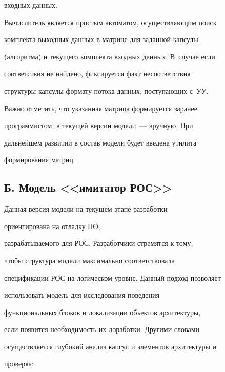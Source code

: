 входных данных.


   


   Вычислитель является простым  автоматом, осуществляющим поиск 


комплекта выходных данных в матрице для заданной капсулы 


(алгоритма) и текущего комплекта  входных данных. В~случае если 


соответствия не найдено,  фиксируется факт несоответствия 


структуры капсулы формату потока  данных, поступающих с~УУ. 


   


   Важно отметить, что указанная матрица формируется заранее 


программистом, в текущей версии модели~--- вручную. При 


дальнейшем развитии в состав модели будет введена утилита 


формирования матриц.





\subsection*{Б. Модель <<имитатор РОС>>}





   Данная версия модели на  текущем этапе разработки 


ориентирована на отладку ПО, 


разрабатываемого для РОС. Разработчики стремятся к тому, 


чтобы структура модели  максимально соответствовала 


спецификации РОС на логическом  уровне. Данный подход позволяет 


использовать модель для  исследования поведения 


функциональных блоков и  локализации объектов архитектуры, 


если появится необходимость их  доработки. Другими словами 


осуществляется глубокий анализ  капсул и элементов архитектуры и 


проверка:


